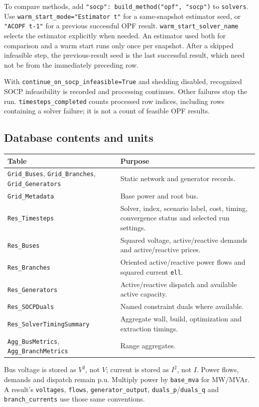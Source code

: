 \documentclass[11pt,a4paper]{article}
\newcommand{\code}[1]{\nolinkurl{#1}}
\begin{document}
To compare methods, add \code{"socp": build_method("opf", "socp")} to
\code{solvers}. Use \code{warm_start_mode="Estimator t"} for a same-snapshot
estimator seed, or \code{"ACOPF t-1"} for a previous successful OPF result.
\code{warm_start_solver_name} selects the estimator explicitly when needed.
An estimator used both for comparison and a warm start runs only once per
snapshot. After a skipped infeasible step, the previous-result seed is the
last successful result, which need not be from the immediately preceding row.

With \code{continue_on_socp_infeasible=True} and shedding disabled, recognized
SOCP infeasibility is recorded and processing continues. Other failures stop
the run. \code{timesteps_completed} counts processed row indices, including
rows containing a solver failure; it is not a count of feasible OPF results.

\subsection{Database contents and units}
\begin{longtable}{p{.32\linewidth}p{.60\linewidth}}
\toprule Table & Purpose \\\midrule\endhead
\code{Grid_Buses}, \code{Grid_Branches}, \code{Grid_Generators} & Static network and generator records.\\
\code{Grid_Metadata} & Base power and root bus.\\
\code{Res_Timesteps} & Solver, index, scenario label, cost, timing, convergence status and selected run settings.\\
\code{Res_Buses} & Squared voltage, active/reactive demands and active/reactive prices.\\
\code{Res_Branches} & Oriented active/reactive power flows and squared current \code{ell}.\\
\code{Res_Generators} & Active/reactive dispatch and available active capacity.\\
\code{Res_SOCPDuals} & Named constraint duals where available.\\
\code{Res_SolverTimingSummary} & Aggregate wall, build, optimization and extraction timings.\\
\code{Agg_BusMetrics}, \code{Agg_BranchMetrics} & Range aggregates.\\
\bottomrule
\end{longtable}
Bus voltage is stored as \(V^2\), not \(V\); current is stored as \(I^2\),
not \(I\). Power flows, demands and dispatch remain p.u. Multiply power by
\code{base_mva} for MW/MVAr. A result's \code{voltages}, \code{flows},
\code{generator_output}, \code{duals_p}/\code{duals_q} and
\code{branch_currents} use those same conventions.
\end{document}
